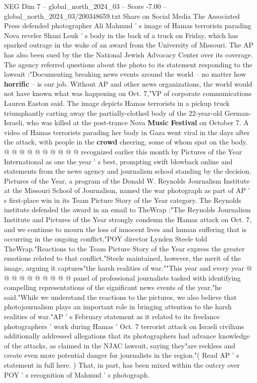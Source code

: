 \begin{textsample}{NEG Dim 7 – global\_north\_2024\_03 – Score -7.00 – global\_north\_2024\_03/200348659.txt}  \label{ex:f7_neg_239}
Share on Social Media The Associated Press defended photographer Ali Mahmud ' s image of Hamas terrorists parading Nova reveler Shani Louk ' s body in the back of a truck on Friday, which has sparked outrage in the wake of an award from the University of Missouri.
The AP has also been sued by the the National Jewish Advocacy Center over its coverage.
The agency referred questions about the photo to its statement responding to the lawsuit :"Documenting breaking news events around the world -- no matter how \textbf{horrific} -- is our job.
Without AP and other news organizations, the world would not have known what was happening on Oct. 7,"VP of corporate communications Lauren Easton said.
The image depicts Hamas terrorists in a pickup truck triumphantly carting away the partially-clothed body of the 22-year-old German-Israeli, who was killed at the post-trance Nova \textbf{Music} \textbf{Festival} on October 7.
A video of Hamas terrorists parading her body in Gaza went viral in the days after the attack, with people in the \textbf{crowd} cheering, some of whom spat on the body. @ @ @ @ @ @ @ @ @ @ recognized earlier this month by Pictures of the Year International as one the year ' s best, prompting swift blowback online and statements from the news agency and journalism school standing by the decision.
Pictures of the Year, a program of the Donald W.
Reynolds Journalism Institute at the Missouri School of Journalism, named the war photograph as part of AP ' s first-place win in its Team Picture Story of the Year category.
The Reynolds institute defended the award in an email to TheWrap :"The Reynolds Journalism Institute and Pictures of the Year strongly condemn the Hamas attack on Oct. 7, and we continue to mourn the loss of innocent lives and human suffering that is occurring in the ongoing conflict,"POY director Lynden Steele told TheWrap."Reactions to the Team Picture Story of the Year express the greater emotions related to that conflict."Steele maintained, however, the merit of the image, arguing it captures"the harsh realities of war.""This year and every year @ @ @ @ @ @ @ @ @ @ panel of professional journalists tasked with identifying compelling representations of the significant news events of the year,"he said."While we understand the reactions to the pictures, we also believe that photojournalism plays an important role in bringing attention to the harsh realities of war."AP ' s February statement as it related to its freelance photographers ' work during Hamas ' Oct. 7 terrorist attack on Israeli civilians additionally addressed allegations that its photographers had advance knowledge of the attacks, as claimed in the NJAC lawsuit, saying they"are reckless and create even more potential danger for journalists in the region."( Read AP ' s statement in full here. ) That, in part, has been mixed within the outcry over POY ' s recognition of Mahmud ' s photograph.

\end{textsample}
